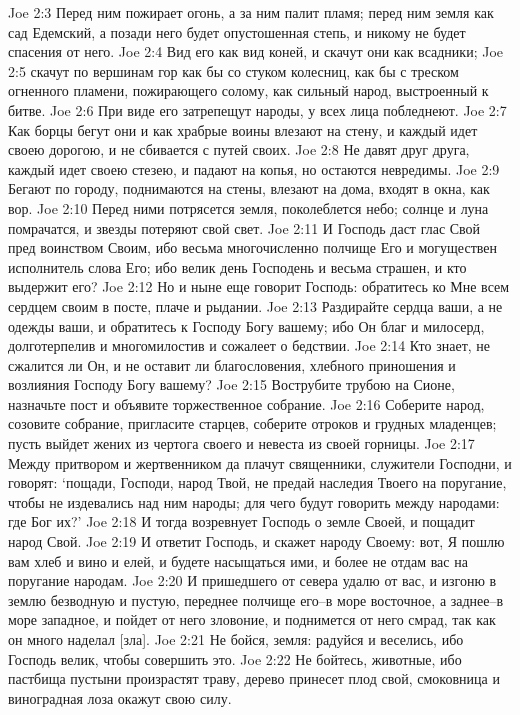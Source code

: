 Joe 2:3  Перед ним пожирает огонь, а за ним палит пламя; перед ним земля как сад Едемский, а позади него будет опустошенная степь, и никому не будет спасения от него.
Joe 2:4  Вид его как вид коней, и скачут они как всадники;
Joe 2:5  скачут по вершинам гор как бы со стуком колесниц, как бы с треском огненного пламени, пожирающего солому, как сильный народ, выстроенный к битве.
Joe 2:6  При виде его затрепещут народы, у всех лица побледнеют.
Joe 2:7  Как борцы бегут они и как храбрые воины влезают на стену, и каждый идет своею дорогою, и не сбивается с путей своих.
Joe 2:8  Не давят друг друга, каждый идет своею стезею, и падают на копья, но остаются невредимы.
Joe 2:9  Бегают по городу, поднимаются на стены, влезают на дома, входят в окна, как вор.
Joe 2:10  Перед ними потрясется земля, поколеблется небо; солнце и луна помрачатся, и звезды потеряют свой свет.
Joe 2:11  И Господь даст глас Свой пред воинством Своим, ибо весьма многочисленно полчище Его и могуществен исполнитель слова Его; ибо велик день Господень и весьма страшен, и кто выдержит его?
Joe 2:12  Но и ныне еще говорит Господь: обратитесь ко Мне всем сердцем своим в посте, плаче и рыдании.
Joe 2:13  Раздирайте сердца ваши, а не одежды ваши, и обратитесь к Господу Богу вашему; ибо Он благ и милосерд, долготерпелив и многомилостив и сожалеет о бедствии.
Joe 2:14  Кто знает, не сжалится ли Он, и не оставит ли благословения, хлебного приношения и возлияния Господу Богу вашему?
Joe 2:15  Вострубите трубою на Сионе, назначьте пост и объявите торжественное собрание.
Joe 2:16  Соберите народ, созовите собрание, пригласите старцев, соберите отроков и грудных младенцев; пусть выйдет жених из чертога своего и невеста из своей горницы.
Joe 2:17  Между притвором и жертвенником да плачут священники, служители Господни, и говорят: `пощади, Господи, народ Твой, не предай наследия Твоего на поругание, чтобы не издевались над ним народы; для чего будут говорить между народами: где Бог их?'
Joe 2:18  И тогда возревнует Господь о земле Своей, и пощадит народ Свой.
Joe 2:19  И ответит Господь, и скажет народу Своему: вот, Я пошлю вам хлеб и вино и елей, и будете насыщаться ими, и более не отдам вас на поругание народам.
Joe 2:20  И пришедшего от севера удалю от вас, и изгоню в землю безводную и пустую, переднее полчище его--в море восточное, а заднее--в море западное, и пойдет от него зловоние, и поднимется от него смрад, так как он много наделал [зла].
Joe 2:21  Не бойся, земля: радуйся и веселись, ибо Господь велик, чтобы совершить это.
Joe 2:22  Не бойтесь, животные, ибо пастбища пустыни произрастят траву, дерево принесет плод свой, смоковница и виноградная лоза окажут свою силу.
